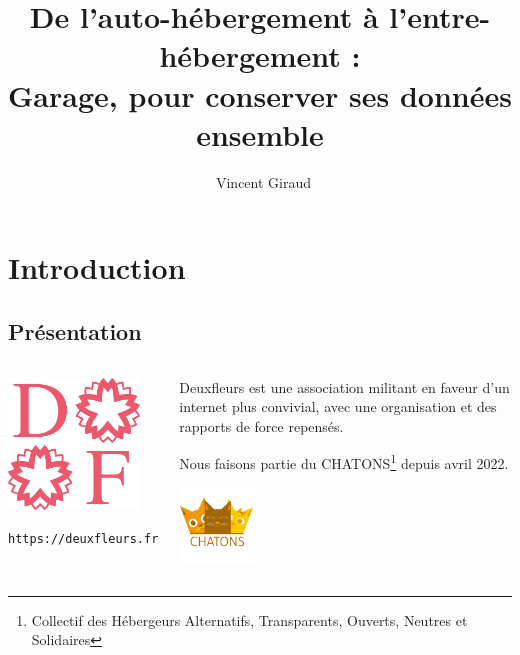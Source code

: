 \documentclass[11pt, aspectratio=1610]{beamer}
\author[Association Deuxfleurs]{~\linebreak Vincent Giraud}
\title[De l'auto-hébergement à l'entre-hébergement avec Garage]{De l'auto-hébergement à l'entre-hébergement :\\Garage, pour conserver ses données ensemble}
\date{Capitole du Libre 2022\linebreak

\scriptsize Samedi 19 novembre 2022\linebreak
}
\begin{document}
\begin{frame}
\titlepage
\end{frame}

\section{Introduction}
\subsection{Présentation}
\begin{frame}
\begin{columns}
\begin{center}
\includegraphics[width=3.5cm]{deuxfleurs-logo.png}\linebreak

\texttt{https://deuxfleurs.fr}
\end{center}
\begin{center}
Deuxfleurs est une association militant en faveur d'un internet plus convivial, avec une organisation et des rapports de force repensés.\linebreak

Nous faisons partie du CHATONS\footnote[frame]{Collectif des Hébergeurs Alternatifs, Transparents, Ouverts, Neutres et Solidaires} depuis avril 2022.

\includegraphics[width=2cm]{logo_chatons.png}
\end{center}
\end{columns}
\end{frame}
\end{document}
